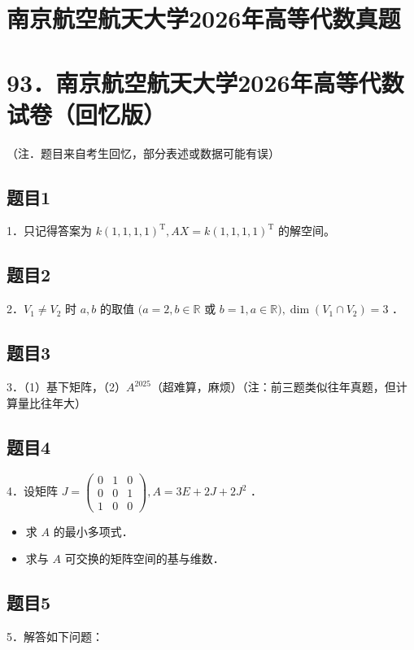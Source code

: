\documentclass{article}
\begin{document}
\section*{南京航空航天大学2026年高等代数真题}
\section*{93．南京航空航天大学2026年高等代数试卷（回忆版）}
（注．题目来自考生回忆，部分表述或数据可能有误）\\

\subsection{题目1}
1．只记得答案为 \(k(1,1,1,1)^{\mathrm{T}}, A X=k(1,1,1,1)^{\mathrm{T}}\) 的解空间。

\subsection{题目2}
2．\(V_{1} \neq V_{2}\) 时 \(a, b\) 的取值 \((a=2, b \in \mathbb{R}\) 或 \(b=1, a \in \mathbb{R}), \operatorname{dim}\left(V_{1} \cap V_{2}\right)=3\) ．

\subsection{题目3}
3．（1）基下矩阵，（2）\(A^{2025}\)（超难算，麻烦）（注：前三题类似往年真题，但计算量比往年大）

\subsection{题目4}
4．设矩阵 \(J=\left(\begin{array}{lll}0 & 1 & 0 \\ 0 & 0 & 1 \\ 1 & 0 & 0\end{array}\right), A=3 E+2 J+2 J^{2}\) ．

\begin{itemize}
  \item[（1）] 求 \(A\) 的最小多项式．
  \item[（2）] 求与 \(A\) 可交换的矩阵空间的基与维数．
\end{itemize}

\subsection{题目5}
5．解答如下问题：
\end{document}
